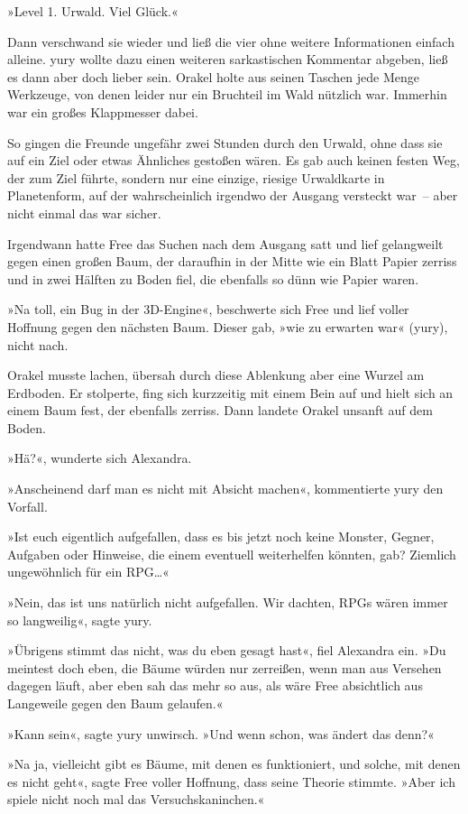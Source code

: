 »Level 1. Urwald. Viel Glück.«

Dann verschwand sie wieder und ließ die vier ohne weitere Informationen einfach alleine. yury wollte dazu einen weiteren sarkastischen Kommentar abgeben, ließ es dann aber doch lieber sein. Orakel holte aus seinen Taschen jede Menge Werkzeuge, von denen leider nur ein Bruchteil im Wald nützlich war. Immerhin war ein großes Klappmesser dabei.

So gingen die Freunde ungefähr zwei Stunden durch den Urwald, ohne dass sie auf ein Ziel oder etwas Ähnliches gestoßen wären. Es gab auch keinen festen Weg, der zum Ziel führte, sondern nur eine einzige, riesige Urwaldkarte in Planetenform, auf der wahrscheinlich irgendwo der Ausgang versteckt war~– aber nicht einmal das war sicher.

Irgendwann hatte Free das Suchen nach dem Ausgang satt und lief gelangweilt gegen einen großen Baum, der daraufhin in der Mitte wie ein Blatt Papier zerriss und in zwei Hälften zu Boden fiel, die ebenfalls so dünn wie Papier waren.

»Na toll, ein Bug in der 3D-Engine«, beschwerte sich Free und lief voller Hoffnung gegen den nächsten Baum. Dieser gab, »wie zu erwarten war« (yury), nicht nach.

Orakel musste lachen, übersah durch diese Ablenkung aber eine Wurzel am Erdboden. Er stolperte, fing sich kurzzeitig mit einem Bein auf und hielt sich an einem Baum fest, der ebenfalls zerriss. Dann landete Orakel unsanft auf dem Boden.

»Hä?«, wunderte sich Alexandra.

»Anscheinend darf man es nicht mit Absicht machen«, kommentierte yury den Vorfall.

»Ist euch eigentlich aufgefallen, dass es bis jetzt noch keine Monster, Gegner, Aufgaben oder Hinweise, die einem eventuell weiterhelfen könnten, gab? Ziemlich ungewöhnlich für ein RPG…«

»Nein, das ist uns natürlich nicht aufgefallen. Wir dachten, RPGs wären immer so langweilig«, sagte yury.

»Übrigens stimmt das nicht, was du eben gesagt hast«, fiel Alexandra ein. »Du meintest doch eben, die Bäume würden nur zerreißen, wenn man aus Versehen dagegen läuft, aber eben sah das mehr so aus, als wäre Free absichtlich aus Langeweile gegen den Baum gelaufen.«

»Kann sein«, sagte yury unwirsch. »Und wenn schon, was ändert das denn?«

»Na ja, vielleicht gibt es Bäume, mit denen es funktioniert, und solche, mit denen es nicht geht«, sagte Free voller Hoffnung, dass seine Theorie stimmte. »Aber ich spiele nicht noch mal das Versuchskaninchen.«

